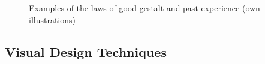 \begin{enumerate}
\begin{figure}[H]
\begin{minipage}[b]{.5\linewidth}
            \label{fig:exo}
        \end{minipage}
        \caption[Laws of Good Gestalt and Past Experience]{Examples of the laws of good gestalt and past experience (own illustrations)}\label{fig:law4}
    \end{figure}
\end{enumerate}

\subsection{Visual Design Techniques}
